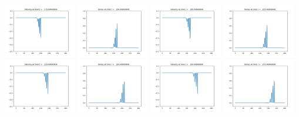 \documentclass[11pt]{article}
\begin{document}
\includegraphics[width=0.2375\textwidth]{frame0007fig2.png}
\vskip 10pt 
\includegraphics[width=0.2375\textwidth]{frame0008fig1.png}
\includegraphics[width=0.2375\textwidth]{frame0008fig2.png}
\includegraphics[width=0.2375\textwidth]{frame0009fig1.png}
\includegraphics[width=0.2375\textwidth]{frame0009fig2.png}
\vskip 10pt 
\includegraphics[width=0.2375\textwidth]{frame0010fig1.png}
\includegraphics[width=0.2375\textwidth]{frame0010fig2.png}
\includegraphics[width=0.2375\textwidth]{frame0011fig1.png}
\end{document}
